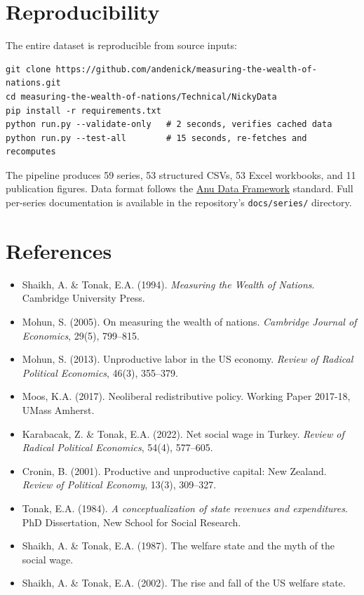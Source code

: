 \documentclass[12pt,a4paper]{article}
\begin{document}
\section{Reproducibility}

The entire dataset is reproducible from source inputs:
\begin{verbatim}
git clone https://github.com/andenick/measuring-the-wealth-of-nations.git
cd measuring-the-wealth-of-nations/Technical/NickyData
pip install -r requirements.txt
python run.py --validate-only   # 2 seconds, verifies cached data
python run.py --test-all        # 15 seconds, re-fetches and recomputes
\end{verbatim}

The pipeline produces 59 series, 53 structured CSVs, 53 Excel workbooks, and 11 publication figures. Data format follows the \href{https://github.com/andenick/anu-data-framework}{Anu Data Framework} standard. Full per-series documentation is available in the repository's \texttt{docs/series/} directory.

\section*{References}

\begin{itemize}
\item Shaikh, A. \& Tonak, E.A. (1994). \textit{Measuring the Wealth of Nations}. Cambridge University Press.
\item Mohun, S. (2005). On measuring the wealth of nations. \textit{Cambridge Journal of Economics}, 29(5), 799--815.
\item Mohun, S. (2013). Unproductive labor in the US economy. \textit{Review of Radical Political Economics}, 46(3), 355--379.
\item Moos, K.A. (2017). Neoliberal redistributive policy. Working Paper 2017-18, UMass Amherst.
\item Karabacak, Z. \& Tonak, E.A. (2022). Net social wage in Turkey. \textit{Review of Radical Political Economics}, 54(4), 577--605.
\item Cronin, B. (2001). Productive and unproductive capital: New Zealand. \textit{Review of Political Economy}, 13(3), 309--327.
\item Tonak, E.A. (1984). \textit{A conceptualization of state revenues and expenditures}. PhD Dissertation, New School for Social Research.
\item Shaikh, A. \& Tonak, E.A. (1987). The welfare state and the myth of the social wage.
\item Shaikh, A. \& Tonak, E.A. (2002). The rise and fall of the US welfare state.
\end{itemize}
\end{document}
